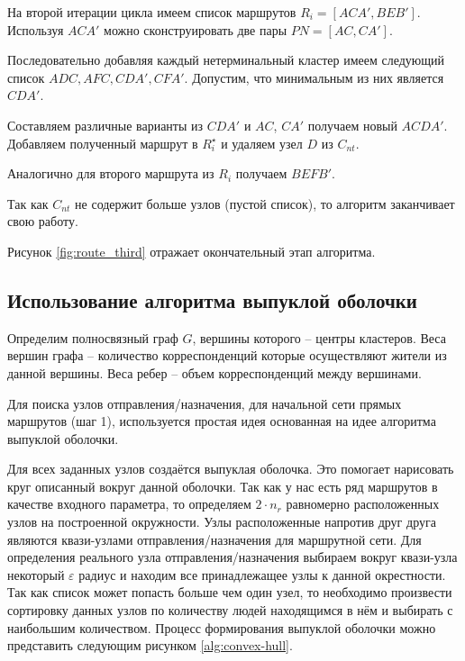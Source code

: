 На второй итерации цикла имеем список маршрутов \( R_i = [ACA', BEB'] \). Используя \( ACA' \) можно 
сконструировать две пары \( PN=[AC, CA'] \).

Последовательно добавляя каждый нетерминальный кластер имеем следующий список \( ADC, AFC, CDA', CFA' \). 
Допустим, что минимальным из них является \( CDA' \).

Составляем различные варианты из \( CDA' \) и \( AC \), \( CA' \) получаем новый \( ACDA' \). Добавляем 
полученный маршрут в \( R^{\star}_i \) и удаляем узел \( D \) из \( C_{nt} \).

Аналогично для второго маршрута из \( R_i \) получаем \( BEFB' \).

Так как \( C_{nt} \) не содержит больше узлов (пустой список), то алгоритм заканчивает свою работу.

Рисунок \ref{fig:route_third} отражает окончательный этап алгоритма.

\subsection{Использование алгоритма выпуклой оболочки}
Определим полносвязный граф \( G \), вершины которого -- центры кластеров. Веса вершин графа -- количество 
корреспонденций которые осуществляют жители из данной вершины. Веса ребер -- объем корреспонденций между 
вершинами.

Для поиска узлов отправления/назначения, для начальной сети прямых маршрутов (шаг 1), используется простая 
идея основанная на идее алгоритма выпуклой оболочки.

Для всех заданных узлов создаётся выпуклая оболочка. Это помогает нарисовать круг описанный вокруг данной
оболочки. Так как у нас есть ряд маршрутов в качестве входного параметра, то определяем \( 2\cdot n_r \) 
равномерно расположенных узлов на построенной окружности. Узлы расположенные напротив друг друга являются 
квази-узлами отправления/назначения для маршрутной сети. Для определения реального узла отправления/назначения 
выбираем вокруг квази-узла некоторый \( \varepsilon \) радиус и находим все принадлежащее узлы к данной 
окрестности. Так как список может попасть больше чем один узел, то необходимо произвести сортировку данных 
узлов по количеству людей находящимся в нём и выбирать с наибольшим количеством. Процесс формирования 
выпуклой оболочки можно представить следующим рисунком \ref{alg:convex-hull}.

